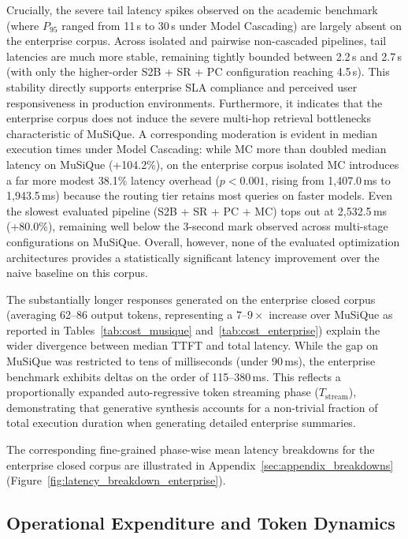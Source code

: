 Crucially, the severe tail latency spikes observed on the academic benchmark (where $P_{95}$ ranged from 11\,s to 30\,s under Model Cascading) are largely absent on the enterprise corpus. Across isolated and pairwise non-cascaded pipelines, tail latencies are much more stable, remaining tightly bounded between 2.2\,s and 2.7\,s (with only the higher-order S2B + SR + PC configuration reaching 4.5\,s). This stability directly supports enterprise SLA compliance and perceived user responsiveness in production environments. Furthermore, it indicates that the enterprise corpus does not induce the severe multi-hop retrieval bottlenecks characteristic of MuSiQue. A corresponding moderation is evident in median execution times under Model Cascading: while MC more than doubled median latency on MuSiQue (+104.2\%), on the enterprise corpus isolated MC introduces a far more modest 38.1\% latency overhead ($p < 0.001$, rising from 1,407.0\,ms to 1,943.5\,ms) because the routing tier retains most queries on faster models. Even the slowest evaluated pipeline (S2B + SR + PC + MC) tops out at 2,532.5\,ms (+80.0\%), remaining well below the 3-second mark observed across multi-stage configurations on MuSiQue. Overall, however, none of the evaluated optimization architectures provides a statistically significant latency improvement over the naive baseline on this corpus. 

The substantially longer responses generated on the enterprise closed corpus (averaging 62--86 output tokens, representing a $7\text{--}9\times$ increase over MuSiQue as reported in Tables~\ref{tab:cost_musique} and~\ref{tab:cost_enterprise}) explain the wider divergence between median TTFT and total latency. While the gap on MuSiQue was restricted to tens of milliseconds (under 90\,ms), the enterprise benchmark exhibits deltas on the order of 115--380\,ms. This reflects a proportionally expanded auto-regressive token streaming phase ($T_{\text{stream}}$), demonstrating that generative synthesis accounts for a non-trivial fraction of total execution duration when generating detailed enterprise summaries.

The corresponding fine-grained phase-wise mean latency breakdowns for the enterprise closed corpus are illustrated in Appendix~\ref{sec:appendix_breakdowns} (Figure~\ref{fig:latency_breakdown_enterprise}).

\FloatBarrier
\subsection{Operational Expenditure and Token Dynamics}
\label{subsec:results_cost}

